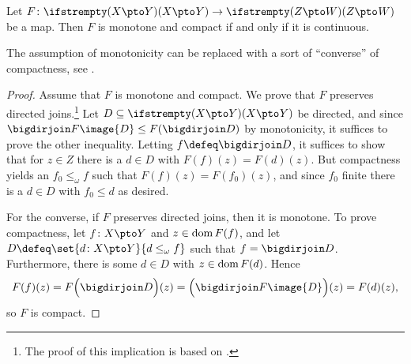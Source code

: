 \begin{proposition}
    \label{prop:partial-map-continuity-equivalent}
    Let $F \colon \pmaps{X}{Y} \to \pmaps{Z}{W}$ be a map. Then $F$ is monotone and compact if and only if it is continuous.
\end{proposition}
%
The assumption of monotonicity can be replaced with a sort of \enquote{converse} of compactness, see \textcite[Proposition~6.23]{moschovakis-set-theory}.

\begin{proof}
    Assume that $F$ is monotone and compact. We prove that $F$ preserves directed joins.\footnote{The proof of this implication is based on \textcite[Lemma~6.29]{moschovakis-set-theory}.} Let $D \subseteq \pmaps{X}{Y}$ be directed, and since $\bigdirjoin F\image{D} \leq F(\bigdirjoin D)$ by monotonicity, it suffices to prove the other inequality. Letting $f \defeq \bigdirjoin D$, it suffices to show that for $z \in Z$ there is a $d \in D$ with $F(f)(z) = F(d)(z)$. But compactness yields an $f_0 \leq_\omega f$ such that $F(f)(z) = F(f_0)(z)$, and since $f_0$ finite there is a $d \in D$ with $f_0 \leq d$ as desired.

    For the converse, if $F$ preserves directed joins, then it is monotone. To prove compactness, let $f \colon X \pto Y$ and $z \in \operatorname{dom} F(f)$, and let $D \defeq \set{d \colon X \pto Y}{d \leq_\omega f}$ such that $f = \bigdirjoin D$. Furthermore, there is some $d \in D$ with $z \in \operatorname{dom} F(d)$. Hence
    \begin{equation*}
        F(f)(z)
            = F\Bigl( \bigdirjoin D \Bigr)(z)
            = \Bigl( \bigdirjoin F\image{D} \Bigr)(z)
            = F(d)(z),
    \end{equation*}
    so $F$ is compact.
\end{proof}


